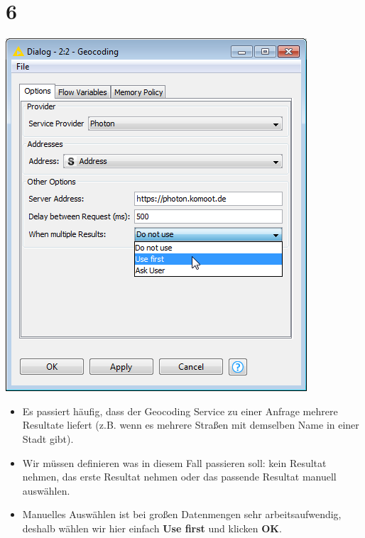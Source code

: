 \documentclass[10pt]{beamer}
\begin{document}
\section{6}
\begin{frame}
	\begin{center}
  		\includegraphics[height=0.5\textheight]{6.png}
	\end{center}
	\begin{itemize}
		\item Es passiert häufig, dass der Geocoding Service zu einer Anfrage mehrere Resultate liefert (z.B. wenn es mehrere Straßen mit demselben Name in einer Stadt gibt).
		\item Wir müssen definieren was in diesem Fall passieren soll: kein Resultat nehmen, das erste Resultat nehmen oder das passende Resultat manuell auswählen.
		\item Manuelles Auswählen ist bei großen Datenmengen sehr arbeitsaufwendig, deshalb wählen wir hier einfach \textbf{Use first} und klicken \textbf{OK}.
	\end{itemize}
\end{frame}
\end{document}
